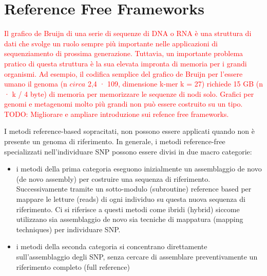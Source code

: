 \documentclass[../main.tex]{subfiles}
\begin{document}
\section{Reference Free Frameworks}
\label{rfm}

\textcolor{red}{
Il grafico de Bruijn di una serie di sequenze di DNA o RNA
è una struttura di dati che svolge un ruolo sempre più importante nelle applicazioni di sequenziamento di prossima generazione. Tuttavia, un importante problema pratico di questa struttura è la sua elevata impronta di memoria per i grandi organismi. Ad esempio, il codifica semplice del grafico de Bruijn per l'essere umano il genoma (n $circa$ 2,4 · 109, dimensione k-mer k = 27) richiede 15 GB (n · k / 4 byte) di memoria per memorizzare le sequenze di nodi solo. Grafici per genomi e metagenomi molto più grandi non può essere costruito su un tipo. TODO: Migliorare e ampliare introduzione sui refence free frameworks.}

I metodi reference-based sopracitati, non possono essere applicati quando non è presente un genoma di riferimento. 
In generale, i metodi reference-free specializzati nell’individuare SNP possono essere divisi in due macro categorie: 
\begin{itemize} 
\item i metodi della prima categoria eseguono inizialmente un assemblaggio de novo (de novo assembly) per costruire una sequenza di riferimento. Successivamente tramite un sotto-modulo (subroutine) reference based per mappare le letture (reads) di ogni individuo su questa nuova sequenza di riferimento. Ci si riferisce a questi metodi come ibridi (hybrid) siccome utilizzano sia assemblaggio de novo sia tecniche di mappatura (mapping techniques) per individuare SNP.
\item i metodi della seconda categoria si concentrano direttamente sull’assemblaggio degli SNP, senza cercare di assemblare preventivamente un riferimento completo (full reference)
\end{itemize}
\end{document}
